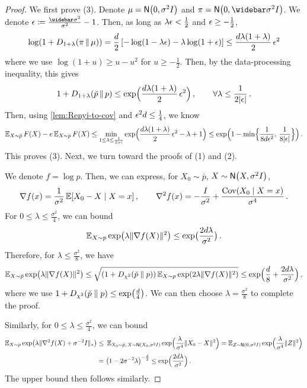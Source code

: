 \begin{proof}
We first prove (3). Denote $\mu=\Nsigma$ and $\pi=\normal{0,\sigbar^2\Id}$. We denote $\eps\deq \frac{\sigbar^2}{\sigma^2}-1$. Then, as long as $\lambda\eps<\frac12$ and $\eps\geq -\frac12$,
\begin{align*}
    \log(1+\Dren[1+\lambda]{\pi}{\mu})=\frac{d}{2}\,\brk*{-\log(1-\lambda\eps)-\lambda\log(1+\eps)}
    \leq \frac{d\lambda(1+\lambda)}{2}\,\eps^2
\end{align*}
where we use $\log(1+u)\geq u-u^2$ for $u\geq -\frac12$. Then, by the data-processing inequality, this gives
\begin{align*}
    1+\Dren[1+\lambda]{\breve p}{p}\leq \exp\prn[\Big]{\frac{d\lambda(1+\lambda)}{2}\,\eps^2}\,, \qquad \forall \lambda\leq \frac{1}{2\abs{\eps}}\,.
\end{align*}
Then, using \cref{lem:Renyi-to-cov} and $\eps^2 d\leq \frac14$, we know
\begin{align*}
    \En_{X\sim \breve p} F(X)
    -e\En_{X\sim p} F(X)
    \leq \min_{1 \le \lambda\leq \frac{1}{2\abs{\eps}}}\exp\prn[\Big]{\frac{d\lambda(1+\lambda)}{2}\,\eps^2-\lambda+1} \leq \exp\prn[\Big]{1-\min\crl[\Big]{\frac{1}{8d\eps^2},\,\frac{1}{8\abs{\eps}}}}\,.
\end{align*}
This proves (3).
Next, we turn toward the proofs of (1) and (2).

We denote $f=\log p$. Then, we can express, for $X_0 \sim \bar p$, $X \sim \normal{X,\sigma^2 I}$,
\begin{align*}
    \nabla f(x)=\frac{1}{\sigma^2}\En\brk*{X_0-X\mid X=x}\,, \qquad
    \nabla^2 f(x)=-\frac{\Id}{\sigma^2}+
    \frac{\Cov(X_0\mid X=x)}{\sigma^4}\,.
\end{align*}
For $0\leq \lambda\leq \frac{\sigma^2}{4}$, we can bound
\begin{align*}
    \En_{X\sim p} \exp\prn*{ \lambda\nrm{\nabla f(X)}^2} \leq \exp\prn[\big]{\frac{2d\lambda}{\sigma^2}}\,.
\end{align*}
Therefore, for $\lambda\leq \frac{\sigma^2}{8}$, we have 
\begin{align*}
    \En_{X\sim \breve p} \exp\prn*{ \lambda\nrm{\nabla f(X)}^2} \leq \sqrt{(1+\Dchis{\breve p}{p})\En_{X\sim p} \exp\prn*{ 2\lambda\nrm{\nabla f(X)}^2}} \leq \exp\prn[\Big]{\frac{d}8+\frac{2d\lambda}{\sigma^2}}\,,
\end{align*}
where we use $1+\Dchis{\breve p}{p}\leq \exp\prn*{\frac{d}{4}}$. We can then choose $\lambda=\frac{\sigma^2}{8}$ to complete the proof.

Similarly, for $0\leq \lambda\leq \frac{\sigma^2}{4}$, we can bound
\begin{align*}
    \En_{X\sim p} \exp\prn*{ \lambda\nrmnuc{\nabla^2 f(X)+\sigma^{-2}\Id}}
    \leq&~ \En_{X_0 \sim \bar p,\, X\sim \normal{X_0,\sigma^2 I}} \exp\prn[\Big]{ \frac{\lambda}{\sigma^4}\nrm{X_0-X}^2}
    =\En_{Z\sim \normal{0,\sigma^2\Id}} \exp\prn[\Big]{ \frac{\lambda}{\sigma^4}\nrm{Z}^2} \\[0.25em]
    =&~ \prn*{1-2\sigma^{-2}\lambda}^{-\frac{d}{2}} \leq \exp\prn[\Big]{\frac{2d\lambda}{\sigma^2}}\,.
\end{align*}
The upper bound then follows similarly.
\end{proof}


